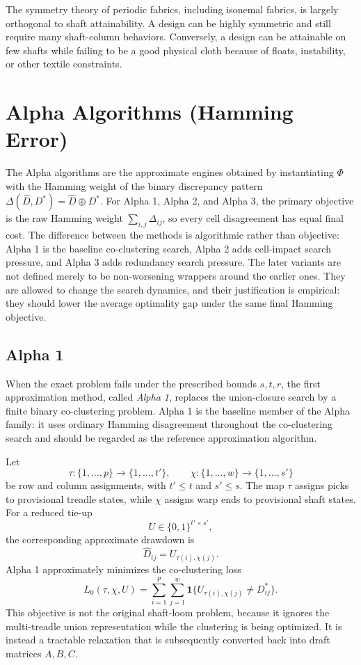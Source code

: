 \documentclass[11pt]{article}
\begin{document}
The symmetry theory of periodic fabrics, including isonemal fabrics, is largely
orthogonal to shaft attainability. A design can be highly symmetric and still
require many shaft-column behaviors. Conversely, a design can be attainable on
few shafts while failing to be a good physical cloth because of floats,
instability, or other textile constraints.

\section{Alpha Algorithms (Hamming Error)}

The Alpha algorithms are the approximate engines obtained by instantiating
\(\Phi\) with the Hamming weight of the binary discrepancy pattern
\(\Delta(\widehat{D},D^\ast)=\widehat{D}\oplus D^\ast\). For Alpha 1, Alpha 2,
and Alpha 3, the primary objective is the raw Hamming weight
\(\sum_{i,j}\Delta_{ij}\), so every cell disagreement has equal final cost.
The difference between the methods is algorithmic rather than objective:
Alpha 1 is the baseline co-clustering search, Alpha 2 adds cell-impact search
pressure, and Alpha 3 adds redundancy search pressure. The later variants are
not defined merely to be non-worsening wrappers around the earlier ones. They
are allowed to change the search dynamics, and their justification is empirical:
they should lower the average optimality gap under the same final Hamming
objective.

\subsection{Alpha 1}
When the exact problem fails under the prescribed bounds
\(s,t,r\), the first approximation method, called \emph{Alpha 1}, replaces the
union-closure search by a finite binary co-clustering problem. Alpha 1 is the
baseline member of the Alpha family: it uses ordinary Hamming disagreement
throughout the co-clustering search and should be regarded as the reference
approximation algorithm.

Let
\[
  \tau:\{1,\dots,p\}\to\{1,\dots,t'\},
  \qquad
  \chi:\{1,\dots,w\}\to\{1,\dots,s'\}
\]
be row and column assignments, with \(t'\le t\) and \(s'\le s\). The map
\(\tau\) assigns picks to provisional treadle states, while \(\chi\) assigns
warp ends to provisional shaft states. For a reduced tie-up
\[
  U\in\{0,1\}^{t'\times s'},
\]
the corresponding approximate drawdown is
\[
  \widehat{D}_{ij}=U_{\tau(i),\chi(j)}.
\]
Alpha 1 approximately minimizes the co-clustering loss
\[
  L_0(\tau,\chi,U)
  =
  \sum_{i=1}^{p}\sum_{j=1}^{w}
  \mathbf{1}\{U_{\tau(i),\chi(j)}\ne D^\ast_{ij}\}.
\]
This objective is not the original shaft-loom problem, because it ignores the
multi-treadle union representation while the clustering is being optimized. It
is instead a tractable relaxation that is subsequently converted back into
draft matrices \(A,B,C\).
\end{document}
